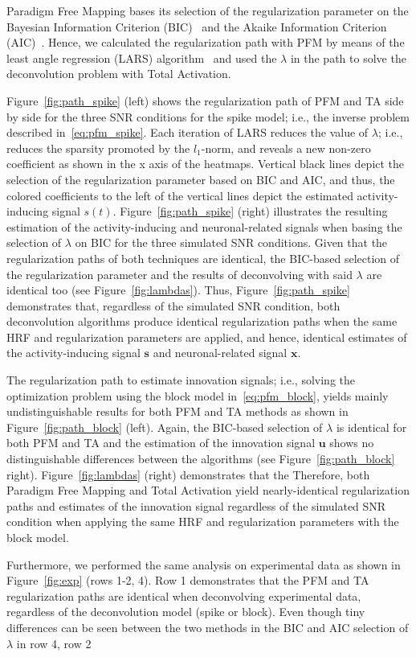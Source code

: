 Paradigm Free Mapping bases its selection of the regularization parameter on the Bayesian Information Criterion (BIC)~\cite{schwarz1978EstimatingDimensionModel} and the Akaike Information Criterion (AIC)~\cite{akaike1998InformationTheoryExtension}. Hence, we calculated the regularization path with PFM by means of the least angle regression (LARS) algorithm~\cite{efron2004LeastAngleRegression} and used the \(\lambda\) in the path to solve the deconvolution problem with Total Activation.

Figure~\ref{fig:path_spike} (left) shows the regularization path of PFM and TA side by side for the three SNR conditions for the spike model; i.e., the inverse problem described in~\eqref{eq:pfm_spike}. Each iteration of LARS reduces the value of \(\lambda\); i.e., reduces the sparsity promoted by the \(l_1\)-norm, and reveals a new non-zero coefficient as shown in the x axis of the heatmaps. Vertical black lines depict the selection of the regularization parameter based on BIC and AIC, and thus, the colored coefficients to the left of the vertical lines depict the estimated activity-inducing signal \(s(t)\). Figure~\ref{fig:path_spike} (right) illustrates the resulting estimation of the activity-inducing and neuronal-related signals when basing the selection of \(\lambda\) on BIC for the three simulated SNR conditions. Given that the regularization paths of both techniques are identical, the BIC-based selection of the regularization parameter and the results of deconvolving with said \(\lambda\) are identical too (see Figure~\ref{fig:lambdas}). Thus, Figure~\ref{fig:path_spike} demonstrates that, regardless of the simulated SNR condition, both deconvolution algorithms produce identical regularization paths when the same HRF and regularization parameters are applied, and hence, identical estimates of the activity-inducing signal \(\mathbf{s}\) and neuronal-related signal \(\mathbf{x}\).

The regularization path to estimate innovation signals; i.e., solving the optimization problem using the block model in~\eqref{eq:pfm_block}, yields mainly undistinguishable results for both PFM and TA methods as shown in Figure~\ref{fig:path_block} (left). Again, the BIC-based selection of \(\lambda\) is identical for both PFM and TA and the estimation of the innovation signal \(\mathbf{u}\) shows no distinguishable differences between the algorithms (see Figure~\ref{fig:path_block} right). Figure~\ref{fig:lambdas} (right) demonstrates that the  Therefore, both Paradigm Free Mapping and Total Activation yield nearly-identical regularization paths and estimates of the innovation signal regardless of the simulated SNR condition when applying the same HRF and regularization parameters with the block model.

Furthermore, we performed the same analysis on experimental data as shown in Figure~\ref{fig:exp} (rows 1-2, 4). Row 1 demonstrates that the PFM and TA regularization paths are identical when deconvolving experimental data, regardless of the deconvolution model (spike or block). Even though tiny differences can be seen between the two methods in the BIC and AIC selection of \(\lambda\) in row 4, row 2 
